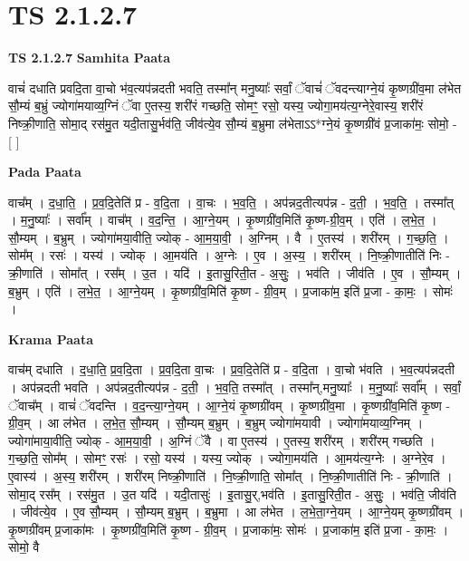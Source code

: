 \documentclass[17pt]{extarticle}
\begin{document}
\section{ TS 2.1.2.7 }

\textbf{TS 2.1.2.7 } \newline
\textbf{Samhita Paata} \newline

वाचं॑ दधाति प्रवदि॒ता वा॒चो भ॑व॒त्यप॑न्नदती भवति॒ तस्मा᳚न् मनु॒ष्याः᳚ सर्वां॒ ॅवाचं॑ ॅवदन्त्याग्ने॒यं कृ॒ष्णग्री॑व॒मा ल॑भेत सौ॒म्यं ब॒भ्रुं ज्योगा॑मयाव्य॒ग्निं ॅवा ए॒तस्य॒ शरी॑रं गच्छति॒ सोमꣳ॒॒ रसो॒ यस्य॒ ज्योगा॒मय॑त्य॒ग्नेरे॒वास्य॒ शरी॑रं निष्क्री॒णाति॒ सोमा॒द् रस॑मु॒त यदी॒तासु॒र्भव॑ति॒ जीव॑त्ये॒व सौ॒म्यं ब॒भ्रुमा ल॑भेताऽऽ*ग्ने॒यं कृ॒ष्णग्री॑वं प्र॒जाका॑मः॒ सोमो॒ - [  ] \newline

\textbf{Pada Paata} \newline

वाच᳚म् । द॒धा॒ति॒ । प्र॒व॒दि॒तेति॑ प्र - व॒दि॒ता । वा॒चः । भ॒व॒ति॒ । अप॑न्नद॒तीत्यप॑न्न - द॒ती॒ । भ॒व॒ति॒ । तस्मा᳚त् । म॒नु॒ष्याः᳚ । सर्वा᳚म् । वाच᳚म् । व॒द॒न्ति॒ । आ॒ग्ने॒यम् । कृ॒ष्णग्री॑व॒मिति॑ कृ॒ष्ण-ग्री॒व॒म् । एति॑ । ल॒भे॒त॒ । सौ॒म्यम् । ब॒भ्रुम् । ज्योगा॑मया॒वीति॒ ज्योक् - आ॒म॒या॒वी॒ । अ॒ग्निम् । वै । ए॒तस्य॑ । शरी॑रम् । ग॒च्छ॒ति॒ । सोम᳚म् । रसः॑ । यस्य॑ । ज्योक् । आ॒मय॑ति । अ॒ग्नेः । ए॒व । अ॒स्य॒ । शरी॑रम् । नि॒ष्क्री॒णातीति॑ निः - क्री॒णाति॑ । सोमा᳚त् । रस᳚म् । उ॒त । यदि॑ । इ॒तासु॒रिती॒त - अ॒सुः॒ । भव॑ति । जीव॑ति । ए॒व । सौ॒म्यम् । ब॒भ्रुम् । एति॑ । ल॒भे॒त॒ । आ॒ग्ने॒यम् । कृ॒ष्णग्री॑व॒मिति॑ कृ॒ष्ण - ग्री॒व॒म् । प्र॒जाका॑म॒ इति॑ प्र॒जा - का॒मः॒ । सोमः॑ ।  \newline


\textbf{Krama Paata} \newline

वाच॑म् दधाति । द॒धा॒ति॒ प्र॒व॒दि॒ता । प्र॒व॒दि॒ता वा॒चः । प्र॒व॒दि॒तेति॑ प्र - व॒दि॒ता । वा॒चो भ॑वति । भ॒व॒त्यप॑न्नदती । अप॑न्नदती भवति । अप॑न्नद॒तीत्यप॑न्न - द॒ती॒ । भ॒व॒ति॒ तस्मा᳚त् । तस्मा᳚न्,मनु॒ष्याः᳚ । म॒नु॒ष्याः᳚ सर्वा᳚म् । सर्वां॒ ॅवाच᳚म् । वाचं॑ ॅवदन्ति । व॒द॒न्त्या॒ग्ने॒यम् । आ॒ग्ने॒यं कृ॒ष्णग्री॑वम् । कृ॒ष्णग्री॑व॒मा । कृ॒ष्णग्री॑व॒मिति॑ कृ॒ष्ण - ग्री॒व॒म् । आ ल॑भेत । ल॒भे॒त॒ सौ॒म्यम् । सौ॒म्यम् ब॒भ्रुम् । ब॒भ्रुम् ज्योगा॑मयावी । ज्योगा॑मयाव्य॒ग्निम् । ज्योगा॑माया॒वीति॒ ज्योक् - आ॒म॒या॒वी॒ । अ॒ग्निं ॅवै । वा ए॒तस्य॑ । ए॒तस्य॒ शरी॑रम् । शरी॑रम् गच्छति । ग॒च्छ॒ति॒ सोम᳚म् । सोमꣳ॒॒ रसः॑ । रसो॒ यस्य॑ । यस्य॒ ज्योक् । ज्योगा॒मय॑ति । आ॒मय॑त्य॒ग्नेः । अ॒ग्नेरे॒व । ए॒वास्य॑ । अ॒स्य॒ शरी॑रम् । शरी॑रम् निष्क्री॒णाति॑ । नि॒ष्क्री॒णाति॒ सोमा᳚त् । नि॒ष्क्री॒णातीति॑ निः - क्री॒णाति॑ । सोमा॒द् रस᳚म् । रस॑मु॒त । उ॒त यदि॑ । यदी॒तासुः॑ । इ॒तासु॒र्,भव॑ति । इ॒तासु॒रिती॒त - अ॒सुः॒ । भव॑ति॒ जीव॑ति । जीव॑त्ये॒व । ए॒व सौ॒म्यम् । सौ॒म्यम् ब॒भ्रुम् । ब॒भ्रुमा । आ ल॑भेत । ल॒भे॒ता॒ग्ने॒यम् । आ॒ग्ने॒यम् कृ॒ष्णग्री॑वम् । कृ॒ष्णग्री॑वम् प्र॒जाका॑मः । कृ॒ष्णग्री॑व॒मिति॑ कृ॒ष्ण - ग्री॒व॒म् । प्र॒जाका॑मः॒ सोमः॑ । प्र॒जाका॑म॒ इति॑ प्र॒जा - का॒मः॒ । सोमो॒ वै \newline
\end{document}

